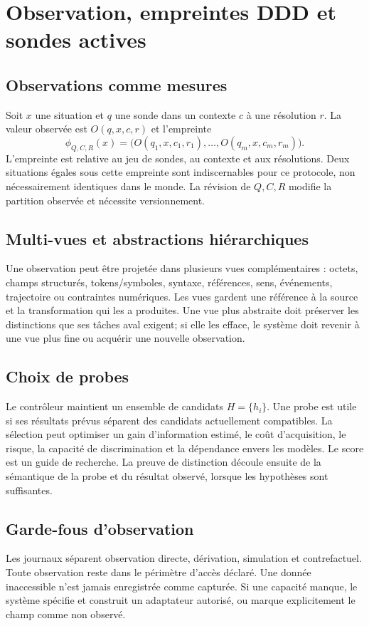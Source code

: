\documentclass[11pt,a4paper]{article}
\begin{document}
\section{Observation, empreintes DDD et sondes actives}
\subsection{Observations comme mesures}
Soit $x$ une situation et $q$ une sonde dans un contexte $c$ à une résolution $r$. La valeur observée est $O(q,x,c,r)$ et l'empreinte
\[
\phi_{Q,C,R}(x)=\big(O(q_1,x,c_1,r_1),\ldots,O(q_m,x,c_m,r_m)\big).
\]
L'empreinte est relative au jeu de sondes, au contexte et aux résolutions. Deux situations égales sous cette empreinte sont indiscernables pour ce protocole, non nécessairement identiques dans le monde. La révision de $Q,C,R$ modifie la partition observée et nécessite versionnement.

\subsection{Multi-vues et abstractions hiérarchiques}
Une observation peut être projetée dans plusieurs vues complémentaires : octets, champs structurés, tokens/symboles, syntaxe, références, sens, événements, trajectoire ou contraintes numériques. Les vues gardent une référence à la source et la transformation qui les a produites. Une vue plus abstraite doit préserver les distinctions que ses tâches aval exigent; si elle les efface, le système doit revenir à une vue plus fine ou acquérir une nouvelle observation.

\subsection{Choix de probes}
Le contrôleur maintient un ensemble de candidats $H=\{h_i\}$. Une probe est utile si ses résultats prévus séparent des candidats actuellement compatibles. La sélection peut optimiser un gain d'information estimé, le coût d'acquisition, le risque, la capacité de discrimination et la dépendance envers les modèles. Le score est un guide de recherche. La preuve de distinction découle ensuite de la sémantique de la probe et du résultat observé, lorsque les hypothèses sont suffisantes.

\subsection{Garde-fous d'observation}
Les journaux séparent observation directe, dérivation, simulation et contrefactuel. Toute observation reste dans le périmètre d’accès déclaré. Une donnée inaccessible n’est jamais enregistrée comme capturée. Si une capacité manque, le système spécifie et construit un adaptateur autorisé, ou marque explicitement le champ comme non observé.
\end{document}
